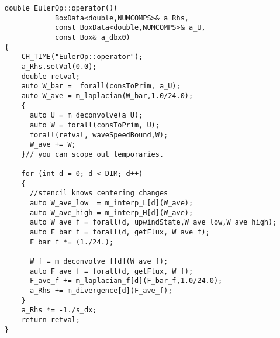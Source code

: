 \begin{lstlisting}[caption=Example EulerOp::operator() using changes]
double EulerOp::operator()(
            BoxData<double,NUMCOMPS>& a_Rhs,
            const BoxData<double,NUMCOMPS>& a_U,
            const Box& a_dbx0)
{
    CH_TIME("EulerOp::operator");
    a_Rhs.setVal(0.0);
    double retval;
    auto W_bar =  forall(consToPrim, a_U);
    auto W_ave = m_laplacian(W_bar,1.0/24.0);
    {
      auto U = m_deconvolve(a_U);
      auto W = forall(consToPrim, U);
      forall(retval, waveSpeedBound,W);
      W_ave += W;
    }// you can scope out temporaries.
  
    for (int d = 0; d < DIM; d++)
    {
      //stencil knows centering changes
      auto W_ave_low  = m_interp_L[d](W_ave); 
      auto W_ave_high = m_interp_H[d](W_ave);   
      auto W_ave_f = forall(d, upwindState,W_ave_low,W_ave_high);
      auto F_bar_f = forall(d, getFlux, W_ave_f);
      F_bar_f *= (1./24.);

      W_f = m_deconvolve_f[d](W_ave_f);
      auto F_ave_f = forall(d, getFlux, W_f);
      F_ave_f += m_laplacian_f[d](F_bar_f,1.0/24.0);
      a_Rhs += m_divergence[d](F_ave_f);
    }
    a_Rhs *= -1./s_dx;
    return retval;
}
\end{lstlisting}
